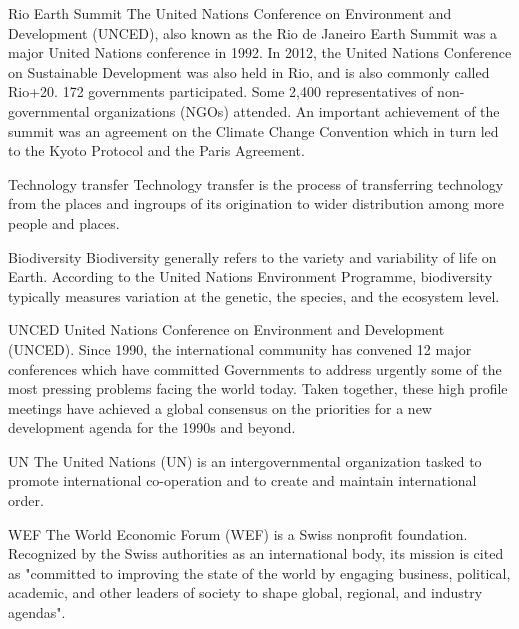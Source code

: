 \begin{sortEnvironment}{Rio Earth Summit}
The United Nations Conference on Environment and Development (UNCED), also known as the Rio de Janeiro Earth Summit was a major United Nations conference in 1992. In 2012, the United Nations Conference on Sustainable Development was also held in Rio, and is also commonly called Rio+20. 172 governments participated. Some 2,400 representatives of non-governmental organizations (NGOs) attended. An important achievement of the summit was an agreement on the Climate Change Convention which in turn led to the Kyoto Protocol and the Paris Agreement.
\end{sortEnvironment}

\begin{sortEnvironment}{Technology transfer}
Technology transfer is the process of transferring technology from the places and ingroups of its origination to wider distribution among more people and places.
\end{sortEnvironment}

\begin{sortEnvironment}{Biodiversity}
Biodiversity generally refers to the variety and variability of life on Earth. According to the United Nations Environment Programme, biodiversity typically measures variation at the genetic, the species, and the ecosystem level.
\end{sortEnvironment}

\begin{sortEnvironment}{UNCED}
United Nations Conference on Environment and Development (UNCED). Since 1990, the international community has convened 12 major conferences which have committed Governments to address urgently some of the most pressing problems facing the world today. Taken together, these high profile meetings have achieved a global consensus on the priorities for a new development agenda for the 1990s and beyond.
\end{sortEnvironment}

\begin{sortEnvironment}{UN}
The United Nations (UN) is an intergovernmental organization tasked to promote international co-operation and to create and maintain international order.
\end{sortEnvironment}

\begin{sortEnvironment}{WEF}
The World Economic Forum (WEF) is a Swiss nonprofit foundation. Recognized by the Swiss authorities as an international body, its mission is cited as "committed to improving the state of the world by engaging business, political, academic, and other leaders of society to shape global, regional, and industry agendas".
\end{sortEnvironment}

